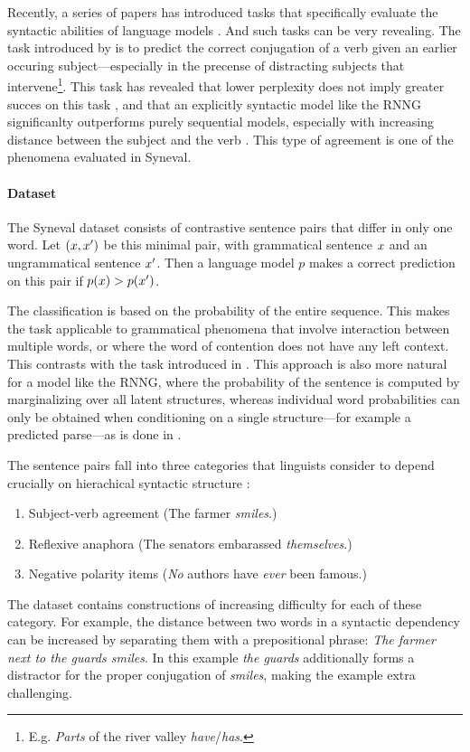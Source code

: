 Recently, a series of papers has introduced tasks that specifically evaluate the syntactic abilities of language models \citep{linzen2016syntax,gulordava2018colorless,linzen2018targeted}. And such tasks can be very revealing. The task introduced by \citet{linzen2016syntax} is to predict the correct conjugation of a verb given an earlier occuring subject---especially in the precense of distracting subjects that intervene\footnote{E.g. \textit{Parts} of the river valley \textit{have}/\textit{has}.}. This task has revealed that lower perplexity does not imply greater succes on this task \citep{tran2018recurrent}, and that an explicitly syntactic model like the RNNG significanlty outperforms purely sequential models, especially with increasing distance between the subject and the verb \citep{kuncoro2018learn}. This type of agreement is one of the phenomena evaluated in Syneval.

\paragraph{Dataset}
The Syneval dataset consists of contrastive sentence pairs that differ in only one word. Let $(x, x')$ be this minimal pair, with grammatical sentence $x$ and an ungrammatical sentence $x'$. Then a language model $p$ makes a correct prediction on this pair if $p(x) > p(x')$.

The classification is based on the probability of the entire sequence. This makes the task applicable to grammatical phenomena that involve interaction between multiple words, or where the word of contention does not have any left context. This contrasts with the task introduced in \citet{linzen2016syntax}. This approach is also more natural for a model like the RNNG, where the probability of the sentence is computed by marginalizing over all latent structures, whereas individual word probabilities can only be obtained when conditioning on a single structure---for example a predicted parse---as is done in \cite{kuncoro2018learn}.

The sentence pairs fall into three categories that linguists consider to depend crucially on hierachical syntactic structure \citep{everaert2015structures,xiang2009illusory}:
  \begin{enumerate}[noitemsep]
    \item Subject-verb agreement (The farmer \textit{smiles}.)
    \item Reflexive anaphora (The senators embarassed \textit{themselves}.)
    \item Negative polarity items (\textit{No} authors have \textit{ever} been famous.)
  \end{enumerate}
The dataset contains constructions of increasing difficulty for each of these category. For example, the distance between two words in a syntactic dependency can be increased by separating them with a prepositional phrase: \textit{The farmer next to the guards smiles}. In this example \textit{the guards} additionally forms a distractor for the proper conjugation of \textit{smiles}, making the example extra challenging.

